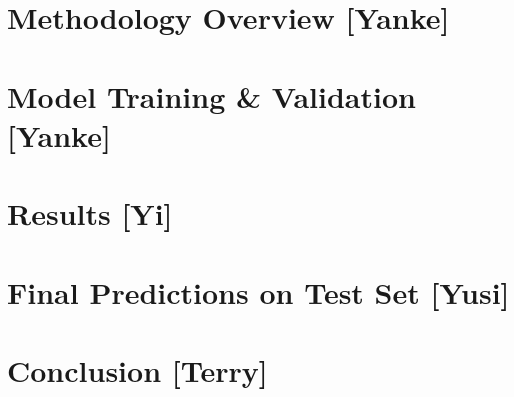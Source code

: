 \documentclass{article}
\begin{document}
\section{Methodology Overview [Yanke]}



\section{Model Training \& Validation [Yanke]}



\section{Results [Yi]}



\section{Final Predictions on Test Set [Yusi]}



\section{Conclusion [Terry]}




  

\begin{thebibliography}{1}

\end{thebibliography}


\end{document}
